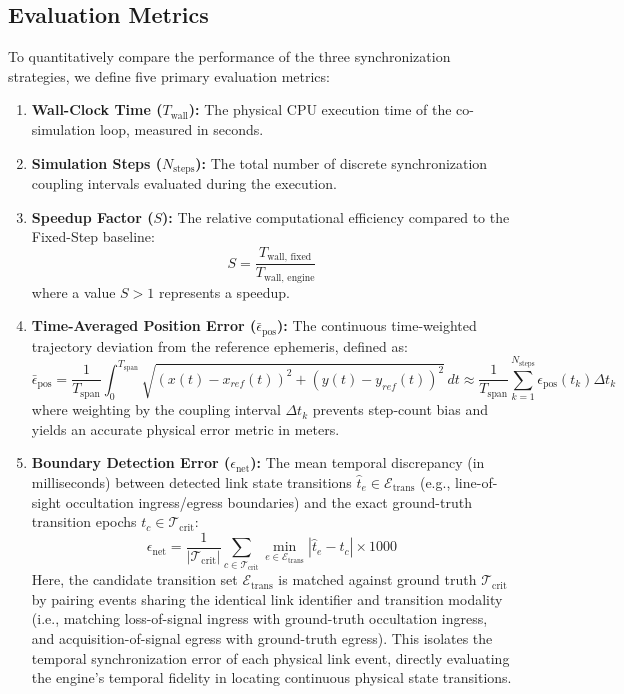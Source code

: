 \documentclass[a4paper,fleqn]{cas-sc}
\begin{document}
\subsection{Evaluation Metrics}
To quantitatively compare the performance of the three synchronization strategies, we define five primary evaluation metrics:
\begin{enumerate}
    \item \textbf{Wall-Clock Time ($T_{\text{wall}}$):} The physical CPU execution time of the co-simulation loop, measured in seconds.
    \item \textbf{Simulation Steps ($N_{\text{steps}}$):} The total number of discrete synchronization coupling intervals evaluated during the execution.
    \item \textbf{Speedup Factor ($S$):} The relative computational efficiency compared to the Fixed-Step baseline:
    \begin{equation}
        S = \frac{T_{\text{wall, fixed}}}{T_{\text{wall, engine}}}
    \end{equation}
    where a value $S > 1$ represents a speedup.
    \item \textbf{Time-Averaged Position Error ($\bar{\epsilon}_{\text{pos}}$):} The continuous time-weighted trajectory deviation from the reference ephemeris, defined as:
    \begin{equation}
        \bar{\epsilon}_{\text{pos}} = \frac{1}{T_{\text{span}}} \int_0^{T_{\text{span}}} \sqrt{(x(t) - x_{ref}(t))^2 + (y(t) - y_{ref}(t))^2} \, dt \approx \frac{1}{T_{\text{span}}} \sum_{k=1}^{N_{\text{steps}}} \epsilon_{\text{pos}}(t_k) \Delta t_k
        \label{eq:pos_err_time_weighted}
    \end{equation}
    where weighting by the coupling interval $\Delta t_k$ prevents step-count bias and yields an accurate physical error metric in meters.
    \item \textbf{Boundary Detection Error ($\epsilon_{\text{net}}$):} The mean temporal discrepancy (in milliseconds) between detected link state transitions $\hat{t}_e \in \mathcal{E}_{\text{trans}}$ (e.g., line-of-sight occultation ingress/egress boundaries) and the exact ground-truth transition epochs $t_c \in \mathcal{T}_{\text{crit}}$:
    \begin{equation}
        \epsilon_{\text{net}} = \frac{1}{|\mathcal{T}_{\text{crit}}|} \sum_{c \in \mathcal{T}_{\text{crit}}} \min_{e \in \mathcal{E}_{\text{trans}}} |\hat{t}_e - t_c| \times 1000
        \label{eq:event_err_corrected}
    \end{equation}
    Here, the candidate transition set $\mathcal{E}_{\text{trans}}$ is matched against ground truth $\mathcal{T}_{\text{crit}}$ by pairing events sharing the identical link identifier and transition modality (i.e., matching loss-of-signal ingress with ground-truth occultation ingress, and acquisition-of-signal egress with ground-truth egress). This isolates the temporal synchronization error of each physical link event, directly evaluating the engine's temporal fidelity in locating continuous physical state transitions.
\end{enumerate}
\end{document}
